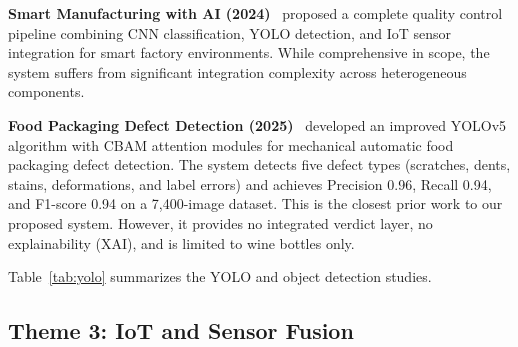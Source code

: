 \documentclass{ieeeaccess}
\begin{document}
\textbf{Smart Manufacturing with AI (2024)}~\cite{smartmfgai2024} proposed a complete quality control pipeline combining CNN classification, YOLO detection, and IoT sensor integration for smart factory environments. While comprehensive in scope, the system suffers from significant integration complexity across heterogeneous components.

\textbf{Food Packaging Defect Detection (2025)}~\cite{liu2025foodpkg} developed an improved YOLOv5 algorithm with CBAM attention modules for mechanical automatic food packaging defect detection. The system detects five defect types (scratches, dents, stains, deformations, and label errors) and achieves Precision 0.96, Recall 0.94, and F1-score 0.94 on a 7,400-image dataset. This is the closest prior work to our proposed system. However, it provides no integrated verdict layer, no explainability (XAI), and is limited to wine bottles only.

Table~\ref{tab:yolo} summarizes the YOLO and object detection studies.

\begin{table}[!t]
\caption{Summary of YOLO and Object Detection Studies}
\label{tab:yolo}
\centering
\small
{}
\end{table}


\subsection{Theme 3: IoT and Sensor Fusion}
\end{document}
